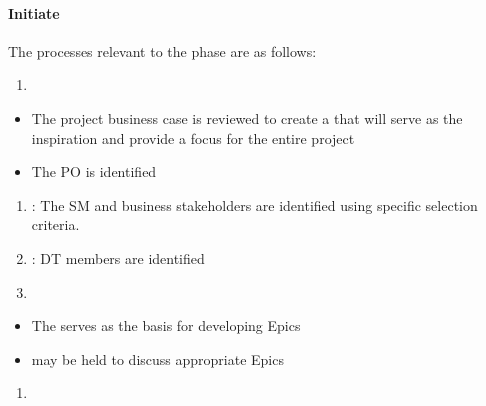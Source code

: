 \documentclass[letterpaper,10pt,english]{jupyterBook}
\begin{document}
\paragraph{Initiate}
\label{\detokenize{APM/sbok:initiate}}
\sphinxAtStartPar
The processes relevant to the  phase are as follows:
\begin{enumerate}
%
\item {} 
\sphinxAtStartPar
{}

\end{enumerate}
\begin{itemize}
\item {} 
\sphinxAtStartPar
The project business case is reviewed to create a  that will serve as the inspiration and provide a focus for the entire project

\item {} 
\sphinxAtStartPar
The PO is identified

\end{itemize}
\begin{enumerate}
%
\setcounter{enumi}{1}
\item {} 
\sphinxAtStartPar
{}: The SM and business stakeholders are identified using specific selection criteria.

\item {} 
\sphinxAtStartPar
{}: DT members are identified

\item {} 
\sphinxAtStartPar
{}

\end{enumerate}
\begin{itemize}
\item {} 
\sphinxAtStartPar
The  serves as the basis for developing Epics

\item {} 
\sphinxAtStartPar
{} may be held to discuss appropriate Epics

\end{itemize}
\begin{enumerate}
%
\setcounter{enumi}{4}
\item {} 
\sphinxAtStartPar
{}

\end{enumerate}
\end{document}
